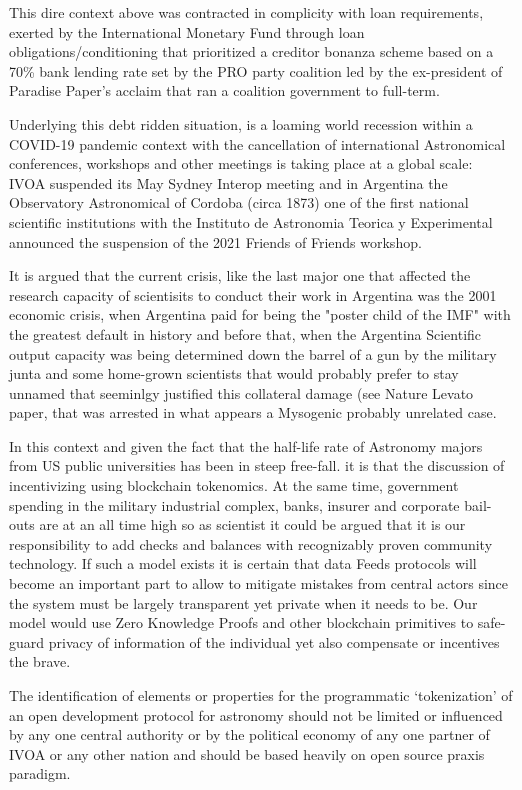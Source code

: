 \documentclass[final,5p,times,twocolumn,authoryear]{elsarticle}
\begin{document}
This dire context above was contracted in complicity with loan requirements, exerted by the International Monetary Fund through loan obligations/conditioning that prioritized a creditor bonanza scheme based on a 70\% bank lending rate set by the PRO party coalition led by the ex-president of Paradise Paper's acclaim that ran a coalition government to full-term. 

Underlying this debt ridden situation, is a loaming world recession within a COVID-19 pandemic context with the cancellation of international Astronomical conferences, workshops and other meetings is taking place at a global scale: IVOA suspended its May Sydney Interop meeting and in Argentina the Observatory Astronomical of Cordoba (circa 1873) one of the first national scientific institutions with the Instituto de Astronomia Teorica y Experimental announced the suspension of the 2021 Friends of Friends workshop. 

It is argued that the current crisis, like the last major one that affected the research capacity of scientisits to conduct their work in Argentina was the 2001 economic crisis, when Argentina paid for being the "poster child of the IMF" with the greatest default in history and before that, when the Argentina Scientific output capacity was being determined down the barrel of a gun by the military junta and some home-grown scientists that would probably prefer to stay unnamed that seeminlgy justified this collateral damage (see Nature Levato paper, that was arrested in what appears a Mysogenic probably unrelated case.

In this context and given the fact that the half-life rate of Astronomy majors from US public universities has been in steep free-fall.  \cite{milo_2018} it is that the discussion of incentivizing using blockchain tokenomics. At the same time, government spending in the military industrial complex, banks, insurer and corporate bail-outs are at an all time high so as scientist it could be argued that it is our responsibility to add checks and balances with recognizably proven community technology. 
%
If such a model exists it is certain that data Feeds protocols will become an important part to allow to mitigate mistakes from central actors since the system must be largely transparent yet private when it needs to be. Our model would use Zero Knowledge Proofs and other blockchain primitives to safe-guard privacy of information of the individual yet also compensate or incentives the brave. 
   
The identification of elements or properties for the programmatic `tokenization' of an open development protocol for astronomy should not be limited or influenced by any one central authority or by the political economy of any one partner of IVOA or any other nation and should be based heavily on open source praxis paradigm. 
   
\end{document}
